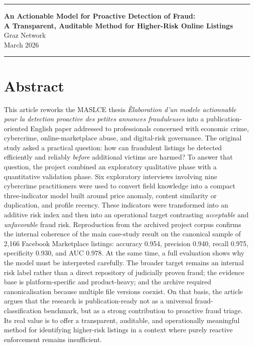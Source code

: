\documentclass[11pt,a4paper]{article}
\newcommand{\topruleline}{\color{accent}\rule{\textwidth}{1.2pt}}
\begin{document}
\thispagestyle{empty}

{\topruleline}
\begin{center}
{\LARGE\bfseries An Actionable Model for Proactive Detection of Fraud:}\\[0.2em]
{\LARGE\bfseries A Transparent, Auditable Method for Higher-Risk Online Listings}\\[0.65em]
{\large Graz Network}\\[0.8em]
{\small March 2026}
\end{center}
{\topruleline}

\section*{Abstract}
This article reworks the MASLCE thesis \emph{\`Elaboration d'un modele actionnable pour la detection proactive des petites annonces frauduleuses} into a publication-oriented English paper addressed to professionals concerned with economic crime, cybercrime, online-marketplace abuse, and digital-risk governance. The original study asked a practical question: how can fraudulent listings be detected efficiently and reliably \emph{before} additional victims are harmed? To answer that question, the project combined an exploratory qualitative phase with a quantitative validation phase. Six exploratory interviews involving nine cybercrime practitioners were used to convert field knowledge into a compact three-indicator model built around price anomaly, content similarity or duplication, and profile recency. These indicators were transformed into an additive risk index and then into an operational target contrasting \emph{acceptable} and \emph{unfavorable} fraud risk. Reproduction from the archived project corpus confirms the internal coherence of the main case-study result on the canonical sample of 2,166 Facebook Marketplace listings: accuracy 0.954, precision 0.940, recall 0.975, specificity 0.930, and AUC 0.978. At the same time, a full evaluation shows why the model must be interpreted carefully. The broader target remains an internal risk label rather than a direct repository of judicially proven fraud; the evidence base is platform-specific and product-heavy; and the archive required canonicalisation because multiple file versions coexist. On that basis, the article argues that the research is publication-ready not as a universal fraud-classification benchmark, but as a strong contribution to proactive fraud triage. Its real value is to offer a transparent, auditable, and operationally meaningful method for identifying higher-risk listings in a context where purely reactive enforcement remains insufficient.
\end{document}
